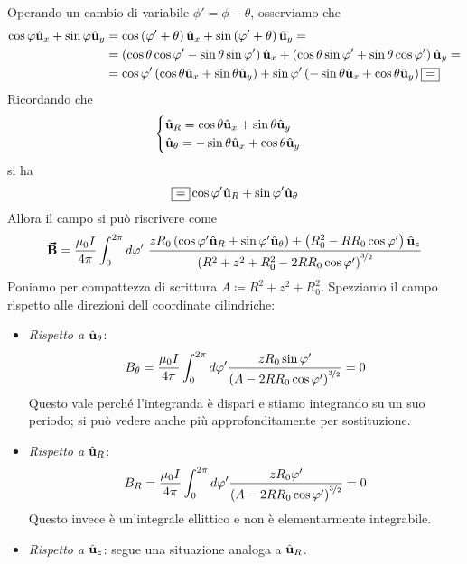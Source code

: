 Operando un cambio di variabile $\phi'=\phi-\theta$, osserviamo che
\begin{align*}
	\cos\phi\vbh{u}_x+\sin\phi\vbh{u}_y&=\cos\left(\phi'+\theta\right)\vbh{u}_x+\sin\left(\phi'+\theta\right)\vbh{u}_y=\\
	&=\left(\cos\theta\cos\phi'-\sin\theta\sin\phi'\right)\vbh{u}_x+\left(\cos\theta\sin\phi'+\sin\theta\cos\phi'\right)\vbh{u}_y=\\
	&=\cos\phi'\left(\cos\theta\vbh{u}_x+\sin\theta\vbh{u}_y\right)+\sin\phi'\left(-\sin\theta\vbh{u}_x+\cos\theta\vbh{u}_y\right)\squarequal
\end{align*}
Ricordando che
\begin{equation*}
	\begin{cases}
		\vbh{u}_R=\cos\theta\vbh{u}_x+\sin\theta\vbh{u}_y\\
		\vbh{u}_{\theta}=-\sin\theta\vbh{u}_x+\cos\theta\vbh{u}_y
	\end{cases}
\end{equation*}
si ha
\begin{equation*}
	\squarequal \cos\phi'\vbh{u}_R+\sin\phi'\vbh{u}_\theta
\end{equation*}
Allora il campo si può riscrivere come
\begin{equation*}
	\vba{B}=\frac{\mu_0 I}{4\pi }\int_0^{2\pi}d\phi'\ \frac{zR_0\left(\cos\phi'\vbh{u}_R+\sin\phi'\vbh{u}_\theta\right)+\left(R_0^2-RR_0\cos\phi'\right)\vbh{u}_z}{\left(R^2+z^2+R_0^2-2RR_0\cos\phi'\right)^{\nicefrac{3}{2}}}
\end{equation*}
Poniamo per compattezza di scrittura $A\coloneqq R^2+z^2+R_0^2$. Spezziamo il campo rispetto alle direzioni dell coordinate cilindriche:
\begin{itemize}
	\item \textit{Rispetto a }$\vbh{u}_{\theta}$:
	\begin{equation*}
		B_\theta=\frac{\mu_0 I}{4\pi }\int_0^{2\pi}d\phi'\frac{zR_0\sin\phi'}{\left(A-2RR_0\cos\phi'\right)^{\nicefrac{3}{2}}}=0
	\end{equation*}
	Questo vale perché l'integranda è dispari e stiamo integrando su un suo periodo; si può vedere anche più approfonditamente per sostituzione.
	\item \textit{Rispetto a} $\vbh{u}_{R}$:
	\begin{equation*}
		B_R=\frac{\mu_0 I}{4\pi }\int_0^{2\pi}d\phi'\frac{zR_0\phi'}{\left(A-2RR_0\cos\phi'\right)^{\nicefrac{3}{2}}}=0
	\end{equation*}
	Questo invece è un'integrale ellittico e non è elementarmente integrabile.
	\item \textit{Rispetto a} $\vbh{u}_z$: segue una situazione analoga a $\vbh{u}_R$.
\end{itemize}
